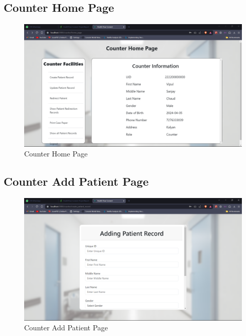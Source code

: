 \subsection{Counter Home Page}
\begin{figure}[h!]
    \centering
    \includegraphics[width=\textwidth]{Counter_Home_Pahe.png}
    \caption{Counter Home Page}
\end{figure}
\subsection{Counter Add Patient Page}
\begin{figure}[h!]
    \centering
    \includegraphics[width=\textwidth]{Counter_Add_Patient.png}
    \caption{Counter Add Patient Page}
\end{figure}

\clearpage
